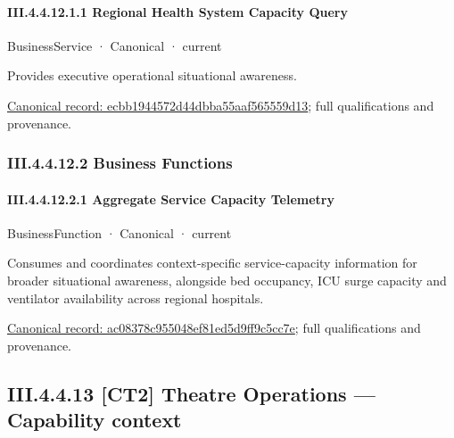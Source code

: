 \paragraph*{III.4.4.12.1.1 Regional Health System Capacity Query}
\label{navigation:III.4.4.12.1.1}

\label{element:ecbb1944572d44dbba55aaf565559d13}
{\small BusinessService · Canonical · current}\par

Provides executive operational situational awareness.


{\footnotesize \href{../../../../continuum/business/business-service/ecbb1944572d44dbba55aaf565559d13.md}{Canonical record: ecbb1944572d44dbba55aaf565559d13}; full qualifications and provenance.}\par
\subsubsection*{III.4.4.12.2 Business Functions}
\label{navigation:III.4.4.12.2}

\paragraph*{III.4.4.12.2.1 Aggregate Service Capacity Telemetry}
\label{navigation:III.4.4.12.2.1}

\label{element:ac08378c955048ef81ed5d9ff9c5cc7e}
{\small BusinessFunction · Canonical · current}\par

Consumes and coordinates context-specific service-capacity information for broader situational awareness, alongside bed occupancy, ICU surge capacity and ventilator availability across regional hospitals.


{\footnotesize \href{../../../../continuum/business/business-function/ac08378c955048ef81ed5d9ff9c5cc7e.md}{Canonical record: ac08378c955048ef81ed5d9ff9c5cc7e}; full qualifications and provenance.}\par
\subsection*{III.4.4.13 [CT2] Theatre Operations — Capability context}
\label{navigation:III.4.4.13}

